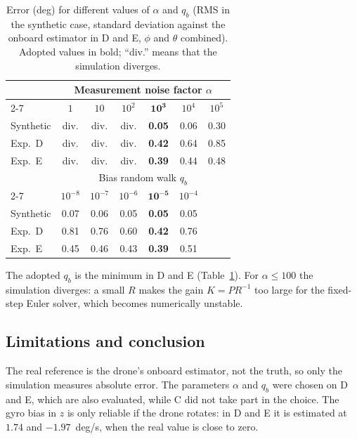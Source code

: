 \documentclass[11pt,a4paper]{article}
\begin{document}
\begin{table}[htbp]
\caption{Error (deg) for different values of $\alpha$ and $q_b$ (RMS in the synthetic case, standard deviation against the onboard estimator in D and E, $\phi$ and $\theta$ combined). Adopted values in bold; ``div.'' means that the simulation diverges.}
\label{tab:sens}
\centering
\setlength{\tabcolsep}{6pt}
\begin{tabular}{l cccccc}
\toprule
 & \multicolumn{6}{c}{Measurement noise factor $\alpha$} \\
\cmidrule(lr){2-7}
 & $1$ & $10$ & $10^{2}$ & $\mathbf{10^{3}}$ & $10^{4}$ & $10^{5}$ \\
\midrule
Synthetic & div. & div. & div. & \textbf{0.05} & 0.06 & 0.30 \\
Exp.\ D   & div. & div. & div. & \textbf{0.42} & 0.64 & 0.85 \\
Exp.\ E   & div. & div. & div. & \textbf{0.39} & 0.44 & 0.48 \\
\midrule
 & \multicolumn{6}{c}{Bias random walk $q_b$} \\
\cmidrule(lr){2-7}
 & $10^{-8}$ & $10^{-7}$ & $10^{-6}$ & $\mathbf{10^{-5}}$ & $10^{-4}$ & \\
\midrule
Synthetic & 0.07 & 0.06 & 0.05 & \textbf{0.05} & 0.05 & \\
Exp.\ D   & 0.81 & 0.76 & 0.60 & \textbf{0.42} & 0.76 & \\
Exp.\ E   & 0.45 & 0.46 & 0.43 & \textbf{0.39} & 0.51 & \\
\bottomrule
\end{tabular}
\end{table}

The adopted $q_b$ is the minimum in D and E (Table~\ref{tab:sens}).
For $\alpha\le100$ the simulation diverges: a small $R$ makes the gain $K=PR^{-1}$ too large for the fixed-step Euler solver, which becomes numerically unstable.

\subsection{Limitations and conclusion}
\label{sec:limits}

The real reference is the drone's onboard estimator, not the truth, so only the simulation measures absolute error.
The parameters $\alpha$ and $q_b$ were chosen on D and E, which are also evaluated, while C did not take part in the choice.
The gyro bias in $z$ is only reliable if the drone rotates: in D and E it is estimated at $1.74$ and $-1.97$~deg/s, when the real value is close to zero.
\end{document}
